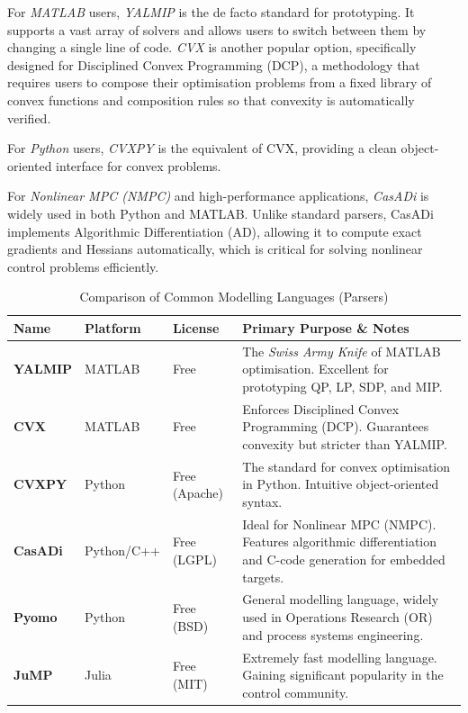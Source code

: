 For \emph{MATLAB} users, \emph{YALMIP} is the de facto standard for prototyping. It supports a vast array of solvers and allows users to switch between them by changing a single line of code. \emph{CVX} is another popular option, specifically designed for Disciplined Convex Programming (DCP), a methodology that requires users to compose their optimisation problems from a fixed library of convex functions and composition rules so that convexity is automatically verified.

For \emph{Python} users, \emph{CVXPY} is the equivalent of CVX, providing a clean object-oriented interface for convex problems. 

For \emph{Nonlinear MPC (NMPC)} and high-performance applications, \emph{CasADi} is widely used in both Python and MATLAB. Unlike standard parsers, CasADi implements Algorithmic Differentiation (AD), allowing it to compute exact gradients and Hessians automatically, which is critical for solving nonlinear control problems efficiently.

\begin{table}[h]
	\centering
	\caption{Comparison of Common Modelling Languages (Parsers)}
	\label{tab:parsers}
	\renewcommand{\arraystretch}{1.3}
	\begin{tabularx}{\textwidth}{@{}l l l X@{}}
		\toprule
		\textbf{Name} & \textbf{Platform} & \textbf{License} & \textbf{Primary Purpose \& Notes} \\
		\midrule
		\textbf{YALMIP} & MATLAB & Free & The \emph{Swiss Army Knife} of MATLAB optimisation. Excellent for prototyping QP, LP, SDP, and MIP. \\
		\textbf{CVX} & MATLAB & Free & Enforces Disciplined Convex Programming (DCP). Guarantees convexity but stricter than YALMIP. \\
		\textbf{CVXPY} & Python & Free (Apache) & The standard for convex optimisation in Python. Intuitive object-oriented syntax. \\
		\textbf{CasADi} & Python/C++ & Free (LGPL) & Ideal for Nonlinear MPC (NMPC). Features algorithmic differentiation and C-code generation for embedded targets. \\
		\textbf{Pyomo} & Python & Free (BSD) & General modelling language, widely used in Operations Research (OR) and process systems engineering. \\
		\textbf{JuMP} & Julia & Free (MIT) & Extremely fast modelling language. Gaining significant popularity in the control community. \\
		\bottomrule
	\end{tabularx}
\end{table}

